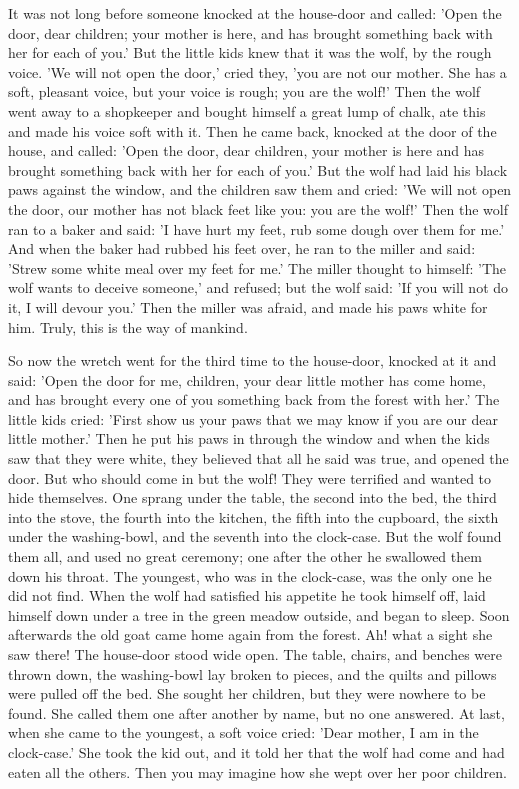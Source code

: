 \documentclass[12pt]{book}
\begin{document}
It was not long before someone knocked at the house-door and called:
'Open the door, dear children; your mother is here, and has brought
something back with her for each of you.' But the little kids knew
that it was the wolf, by the rough voice. 'We will not open the door,'
cried they, 'you are not our mother. She has a soft, pleasant voice,
but your voice is rough; you are the wolf!' Then the wolf went away to
a shopkeeper and bought himself a great lump of chalk, ate this and
made his voice soft with it. Then he came back, knocked at the door of
the house, and called: 'Open the door, dear children, your mother is
here and has brought something back with her for each of you.' But the
wolf had laid his black paws against the window, and the children saw
them and cried: 'We will not open the door, our mother has not black
feet like you: you are the wolf!' Then the wolf ran to a baker and
said: 'I have hurt my feet, rub some dough over them for me.' And when
the baker had rubbed his feet over, he ran to the miller and said:
'Strew some white meal over my feet for me.' The miller thought to
himself: 'The wolf wants to deceive someone,' and refused; but the
wolf said: 'If you will not do it, I will devour you.' Then the miller
was afraid, and made his paws white for him. Truly, this is the way of
mankind.

So now the wretch went for the third time to the house-door, knocked
at it and said: 'Open the door for me, children, your dear little
mother has come home, and has brought every one of you something back
from the forest with her.' The little kids cried: 'First show us your
paws that we may know if you are our dear little mother.' Then he put
his paws in through the window and when the kids saw that they were
white, they believed that all he said was true, and opened the door.
But who should come in but the wolf! They were terrified and wanted to
hide themselves. One sprang under the table, the second into the bed,
the third into the stove, the fourth into the kitchen, the fifth into
the cupboard, the sixth under the washing-bowl, and the seventh into
the clock-case. But the wolf found them all, and used no great
ceremony; one after the other he swallowed them down his throat. The
youngest, who was in the clock-case, was the only one he did not find.
When the wolf had satisfied his appetite he took himself off, laid
himself down under a tree in the green meadow outside, and began to
sleep. Soon afterwards the old goat came home again from the forest.
Ah! what a sight she saw there! The house-door stood wide open. The
table, chairs, and benches were thrown down, the washing-bowl lay
broken to pieces, and the quilts and pillows were pulled off the bed.
She sought her children, but they were nowhere to be found. She called
them one after another by name, but no one answered. At last, when she
came to the youngest, a soft voice cried: 'Dear mother, I am in the
clock-case.' She took the kid out, and it told her that the wolf had
come and had eaten all the others. Then you may imagine how she wept
over her poor children.
\end{document}
